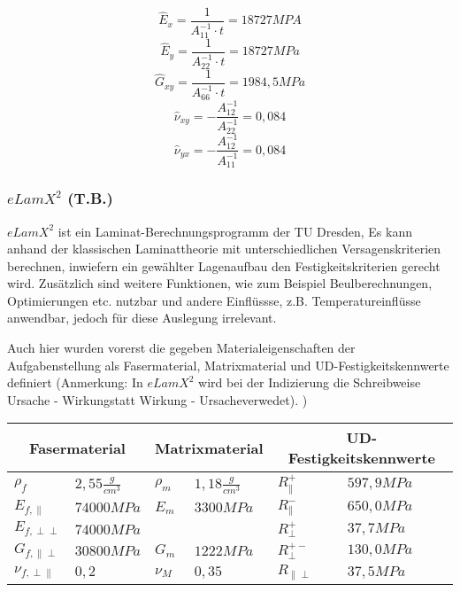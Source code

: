 \begin{equation}
	\hat{E}_{x}=\frac{1}{A_{11}^{-1}\cdot t} = 18727 MPA
\end{equation}
\begin{equation}
	\hat{E}_{y}=\frac{1}{A_{22}^{-1}\cdot t} = 18727 MPa
\end{equation}
\begin{equation}
	\hat{G}_{xy}=\frac{1}{A_{66}^{-1}\cdot t} = 1984,5 MPa
\end{equation}
\begin{equation}
	\hat{\nu}_{xy}=-\frac{A_{12}^{-1}}{A_{22}^{-1}} = 0,084
\end{equation}
\begin{equation}
	\hat{\nu}_{yx}=-\frac{A_{12}^{-1}}{A_{11}^{-1}} = 0,084
\end{equation}


\subsubsection{$eLamX^{2}$ (T.B.)}\label{elamx}
$eLamX^{2}$ ist ein Laminat-Berechnungsprogramm der TU Dresden, Es kann anhand der klassischen Laminattheorie mit unterschiedlichen Versagenskriterien berechnen, inwiefern ein gewählter Lagenaufbau den Festigkeitskriterien gerecht wird. Zusätzlich sind weitere Funktionen, wie zum Beispiel Beulberechnungen, Optimierungen etc. nutzbar und andere Einflüssse, z.B. Temperatureinflüsse anwendbar, jedoch für diese Auslegung irrelevant.

\noindent Auch hier wurden vorerst die gegeben Materialeigenschaften der Aufgabenstellung als Fasermaterial, Matrixmaterial und  UD-Festigkeitskennwerte definiert (Anmerkung: In $eLamX^{2}$ wird bei der Indizierung die Schreibweise \glqq Ursache - Wirkung\grqq statt \glqq Wirkung - Ursache\grqq verwedet). )\\

\begin{tabular}{ll|ll|ll}
	\multicolumn{2}{c}{Fasermaterial} &\multicolumn{2}{c}{Matrixmaterial}  &\multicolumn{2}{c}{UD-Festigkeitskennwerte} \\
	\hline
	$\rho_{f}$ & $2,55 \frac{g}{cm^{3}}$  & $\rho_{m}$ & $1,18 \frac{g}{cm^{3}}$  & $R_{\parallel}^{+}$ & $597,9MPa$ \\
	\hline
	$E_{f,\parallel}$ & $74000MPa$  & $E_{m}$ & $3300MPa$  & $R_{\parallel}^{-}$ & $650,0MPa$\\
	\hline
	$E_{f,\perp\perp}$ & $74000MPa$  &  &   & $R_{\perp}^{+}$ & $37,7MPa$\\
	\hline
	$G_{f,\parallel\perp}$ & $30800MPa$ & $G_{m}$ & $1222MPa$ & $R_{\perp}^{+-}$ & $130,0MPa$\\
	\hline
	$\nu_{f,\perp\parallel}$ & $0,2$  &$\nu_{M}$ &  $0,35$  & $R_{\parallel\perp}$ & $37,5MPa$\\
\end{tabular}\\

